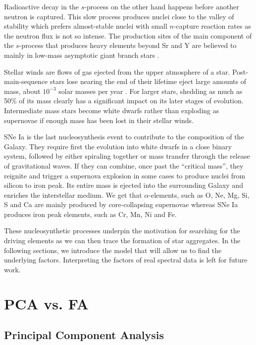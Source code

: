 \documentclass[12pt, letterpaper]{article}
\begin{document}
Radioactive decay in the $s$-process on the other hand happens before another neutron is captured. This slow process produces nuclei close to the valley of stability which prefers almost-stable nuclei with small $n$-capture reaction rates as the neutron flux is not so intense. The production sites of the main component of the $s$-process that produces heavy elements beyond Sr and Y are believed to mainly in low-mass asymptotic giant branch stars \citep{boothroyd2006heavy}.

Stellar winds are flows of gas ejected from the upper atmosphere of a star. Post-main-sequence stars lose nearing the end of their lifetime eject large amounts of mass, about $10^{-3}$ solar masses per year \citep{mattson2011}. For larger stars, shedding as much as 50\% of its mass clearly has a significant impact on its later stages of evolution. Intermediate mass stars become white dwarfs rather than exploding as supernovae if enough mass has been lost in their stellar winds. 

SNe Ia is the last nucleosynthesis event to contribute to the composition of the Galaxy. They require first the evolution into white dwarfs in a close binary system, followed by either spiraling together or mass transfer through the release of gravitational waves. If they can combine, once past the ``critical mass'', they reignite and trigger a supernova explosion in some cases to produce nuclei from silicon to iron peak. Its entire mass is ejected into the surrounding Galaxy and enriches the interstellar medium. We get that $\alpha$-elements, such as O, Ne, Mg, Si, S and Ca are mainly produced by core-collapsing supernovae whereas SNe Ia produces iron peak elements, such as Cr, Mn, Ni and Fe.

These nucleosynthetic processes underpin the motivation for searching for the driving elements as we can then trace the formation of star aggregates. In the following sections, we introduce the model that will allow us to find the underlying factors. Interpreting the factors of real spectral data is left for future work.




\section{PCA vs. FA}

    \subsection{Principal Component Analysis}
    
\end{document}

